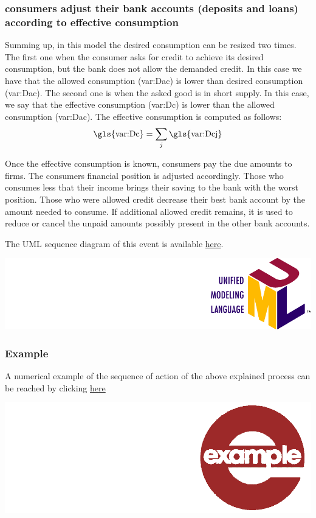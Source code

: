 \documentclass{book}
\newcommand{\doclocation}{file:///Users/giulioni/Documents/workspace/gabriele/docs}
\begin{document}
\subsubsection{consumers adjust their bank accounts (deposits and loans) according to effective consumption}
Summing up, in this model the desired consumption can be resized two times. The first one when the consumer asks for credit to achieve its desired consumption, but the bank does not allow the demanded credit. In this case we have that the allowed consumption (\gls{var:Dac}) is lower than desired consumption (\gls{var:Dac}). The second one is when the asked good is in short supply. In this case, we say that the effective consumption (\gls{var:Dc}) is lower than the allowed consumption (\gls{var:Dac}). The effective consumption is computed as follows:
\[
\textnormal{\gls{var:Dc}}=\sum_j \textnormal{\gls{var:Dcj}}
\]

Once the effective consumption is known, consumers pay the due amounts to firms.
The consumers financial position is adjusted accordingly.
Those who consumes less that their income brings their saving to the bank with the worst position. Those who were allowed credit decrease their best bank account by the amount needed to consume. If additional allowed credit remains, it is used to reduce or cancel the unpaid amounts possibly present in the other bank accounts.   

The UML sequence diagram of this event is available \href{\doclocation/umldoc/updateBankAccountAccordingToEffectiveConsumption.html}{here}.
\begin{marginfigure}
	\includegraphics[scale=0.1]{uml.png}
\end{marginfigure}

\subsubsection{Example}

A numerical example of the sequence of action of the above explained process can be reached by clicking \href{\doclocation/latexdoc/example_consumer_bank_relationship.html}{here}
\begin{marginfigure}
\hskip8mm	\includegraphics[scale=0.07]{example.png}
\end{marginfigure}
\end{document}
